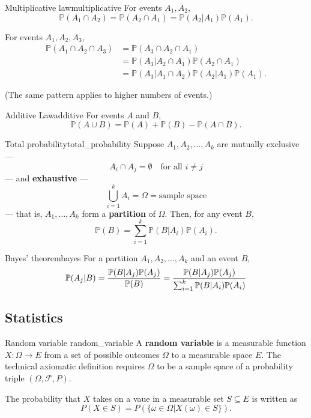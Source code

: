 \begin{theorem}{Multiplicative law}{multiplicative}
For events $A_1, A_2$,
$$ \mathbb{P} (A_1 \cap A_2) = \mathbb{P} (A_2 \cap A_1) = \mathbb{P} (A_2 \vert A_1) \mathbb{P} (A_1) . $$

For events $A_1, A_2, A_3$,
\begin{align*}
\mathbb{P} (A_1 \cap A_2 \cap A_3)
&= \mathbb{P} (A_3 \cap A_2 \cap A_1) \\
&= \mathbb{P} (A_3 \vert A_2 \cap A_1) \mathbb{P} (A_2 \cap A_1) \\
&= \mathbb{P} (A_3 \vert A_1 \cap A_2) \mathbb{P} (A_2 \vert A_1) \mathbb{P} (A_1) .
\end{align*}

(The same pattern applies to higher numbers of events.)
\end{theorem}

\begin{theorem}{Additive Law}{additive}
For events $A$ and $B$,
$$ \mathbb{P} (A \cup B) = \mathbb{P}(A) + \mathbb{P}(B) - \mathbb{P}(A \cap B) . $$
\end{theorem}

\begin{theorem}{Total probability}{total_probability}
Suppose $A_1, A_2, \ldots, A_k$ are mutually exclusive ---
$$ A_i \cap A_j = \emptyset \quad \text{for all } i \not = j $$
--- and \textbf{exhaustive} ---
$$ \bigcup_{i = 1}^k A_i = \Omega = \text{sample space} $$
--- that is, $A_1, \ldots, A_k$ form a \textbf{partition} of $\Omega$. Then, for any event $B$,
$$ \mathbb{P}(B) = \sum_{i=1}^k \mathbb{P}(B \vert A_i) \mathbb{P}(A_i) . $$
\end{theorem}

\begin{theorem}{Bayes' theorem}{bayes}
For a partition $A_1, A_2, \ldots, A_k$ and an event $B$,
$$
\mathbb{P}(A_j \vert B) 
= \dfrac{\mathbb{P}(B \vert A_j) \mathbb{P}(A_j)}{\mathbb{P}(B)} \\
= \dfrac{\mathbb{P}(B \vert A_j) \mathbb{P}(A_j)}{\sum_{i=1}^k \mathbb{P}(B|A_i) \mathbb{P}(A_i)}
$$
\end{theorem}

\subsection{Statistics}

\begin{definition}{Random variable \cite{wikipedia_random_variable}}{random_variable}
	A \textbf{random variable} is a measurable function $X : \Omega \to E$ from a set of possible outcomes $\Omega$ to a measurable space $E$. The technical axiomatic definition requires $\Omega$ to be a sample space of a probability triple $(\Omega, \mathcal{F}, P)$.

	The probability that $X$ takes on a vaue in a measurable set $S \subseteq E$ is written as
	$$ P(X \in S) = P(\{ \omega \in \Omega \vert X(\omega) \in S \}) . $$
\end{definition}

